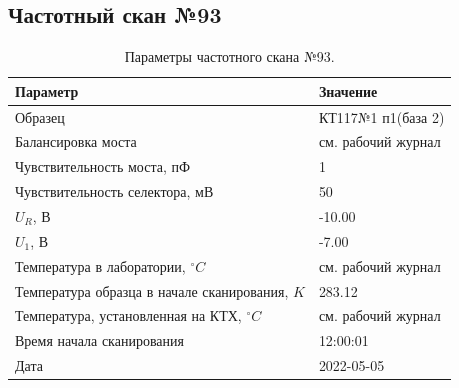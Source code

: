 \subsection{Частотный скан №93}
\begin{table}[!ht]
    \centering
    \caption{Параметры частотного скана №93.}
    \begin{tabular}{|l|l|}
        \hline
        Параметр                                       & Значение                  \\ \hline
        Образец                                        & КТ117№1 п1(база 2)        \\ \hline
        Балансировка моста                             & см. рабочий журнал        \\ \hline
        Чувствительность моста, пФ                     & 1                         \\ \hline
        Чувствительность селектора, мВ                 & 50                        \\ \hline
        $U_R$, В                                       & -10.00                    \\ \hline
        $U_1$, В                                       & -7.00                     \\ \hline
        Температура в лаборатории, $^\circ C$          & см. рабочий журнал        \\ \hline
        Температура образца в начале сканирования, $K$ & 283.12                    \\ \hline
        Температура, установленная на КТХ, $^\circ C$  & см. рабочий журнал        \\ \hline
        Время начала сканирования                      & 12:00:01                  \\ \hline
        Дата                                           & 2022-05-05                \\ \hline
    \end{tabular}
    \label{table:frequency_scan_93}
\end{table}

